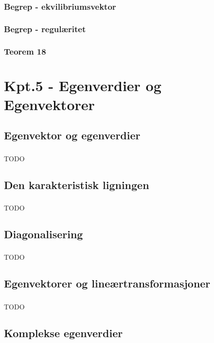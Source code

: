 \documentclass{article}
\begin{document}
      \subsubsection{Begrep - ekvilibriumsvektor}
        
      \subsubsection{Begrep - regulæritet}
        
      \subsubsection{Teorem 18}
        
  \section{Kpt.5 - Egenverdier og Egenvektorer}
    \subsection{Egenvektor og egenverdier}
      \subsubsection{}
        TODO
    \subsection{Den karakteristisk ligningen}
      \subsubsection{}
        TODO
    \subsection{Diagonalisering}
      \subsubsection{}
        TODO
    \subsection{Egenvektorer og lineærtransformasjoner}
      \subsubsection{}
        TODO
    \subsection{Komplekse egenverdier}
\end{document}
